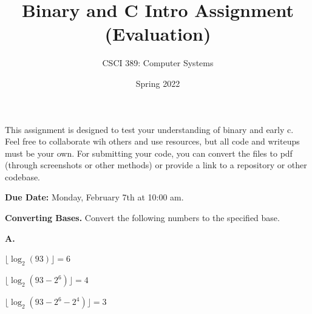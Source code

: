 \documentclass{exam}
\begin{document}
\title{Binary and C Intro Assignment (Evaluation)}
\author{CSCI 389: Computer Systems}
\date{Spring 2022}
\maketitle


This assignment is designed to test your understanding of binary and early c. 
Feel free to collaborate wih others and use resources, but all code and writeups must be your own. 
For submitting your code, you can convert the files to pdf (through screenshots or other methods) or provide a link to a repository or other codebase. 

\textbf{Due Date:}
Monday, February 7th at 10:00 am. 

\begin{questions}

\question[12]
\textbf{Converting Bases.}
Convert the following numbers to the specified base. 

\textbf{A.}

$\lfloor \log_{2}(93) \rfloor = 6$

$\lfloor \log_{2}(93-2^6) \rfloor = 4$

$\lfloor \log_{2}(93-2^6-2^4) \rfloor = 3$


\end{questions}
\end{document}
